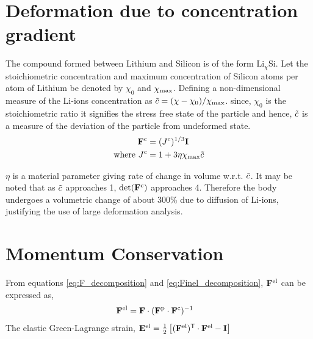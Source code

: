 \documentclass[../main.tex]{subfiles}
\begin{document}
\section{Deformation due to concentration gradient}
The compound formed between Lithium and Silicon is of the form $\text{Li}_{\chi}$Si. Let the stoichiometric concentration and maximum concentration of Silicon atoms per atom of Lithium be denoted by $\chi_0$ and $\chi_{\rm{max}}$. Defining a non-dimensional measure of the Li-ions concentration as $\tilde{c}  = (\chi-\chi_{0})/\chi_{{\rm{max}}}$. since, $\chi_{0}$ is the stoichiometric ratio it signifies the stress free state of the particle and hence, $\tilde{c}$ is a measure of the deviation of the particle from undeformed state.
\begin{align}
    \mathbf{F}^{\rm{c}} &= ({J^c})^{1/3} \mathbf{I} \\
    \text{where } {J^c} &= 1 + 3 \eta \chi_{{\rm{max}}} \tilde{c}
\end{align}

$\eta$ is a material parameter giving rate of change in volume w.r.t. $\tilde{c}$. It may be noted that as $\tilde{c}$ approaches 1, $\mathrm{det}(\mathbf{F}^{\rm{c}})$ approaches 4. Therefore the body undergoes a volumetric change of about 300\% due to diffusion of Li-ions, justifying the use of large deformation analysis.

\section{Momentum Conservation}
From equations \ref{eq:F_decomposition} and \ref{eq:Finel_decomposition}, $\mathbf{F}^{{\rm{el}}}$ can be expressed as, 
\begin{align}
    \mathbf{F}^{{\rm{el}}} &=  \mathbf{F} \cdot (\mathbf{F}^{{\rm{p}}} \cdot \mathbf{F}^{{\rm{c}}})^{-1}
\end{align}
The elastic Green-Lagrange strain, 
\begin{math}
\mathbf{E}^{{\rm{el}}} = \frac{1}{2} \left[ (\mathbf{F}^{\rm{el}})^{\sf {T}} \cdot  \mathbf{F}^{\rm{el}} - \mathbf{I} \right]
\end{math}
\end{document}
